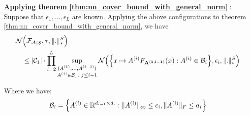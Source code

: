 \noindent\newline\textbf{Applying theorem \ref{thm:nn_cover_bound_with_general_norm}} : Suppose that $\epsilon_1, \dots, \epsilon_L$ are known. Applying the above configurations to theorem \ref{thm:nn_cover_bound_with_general_norm}, we have
\begin{align*}
    \mathcal{N}&\Big( {\mathcal{F}_\mathcal{A}}_{|S}, \tau, \|.\|_*^S \Big) \\
        &\le |\mathcal{C}_1| \cdot \prod_{i=2}^L \sup_{
            \substack{
                (A^{(1)}, \dots, A^{(i-1)}) \\
                A^{(j)} \in \mathcal{B}_j, \ j \le i-1
            }
        }\mathcal{N}\Big( 
            \Big\{ 
                x\mapsto A^{(i)}F_{\bf A^{(1, i-1)}}(x) : A^{(i)}\in\mathcal{B}_i
             \Big\}, \epsilon_i, \|.\|_*^S
         \Big)
\end{align*}

\noindent Where we have:
\begin{align*}
    \mathcal{B}_i = \Big\{ 
        A^{(i)} \in \mathbb{R}^{d_{i-1}\times d_i} : \|A^{(i)}\|_\infty \le c_i, \|A^{(i)}\|_F \le a_i
     \Big\}
\end{align*}
